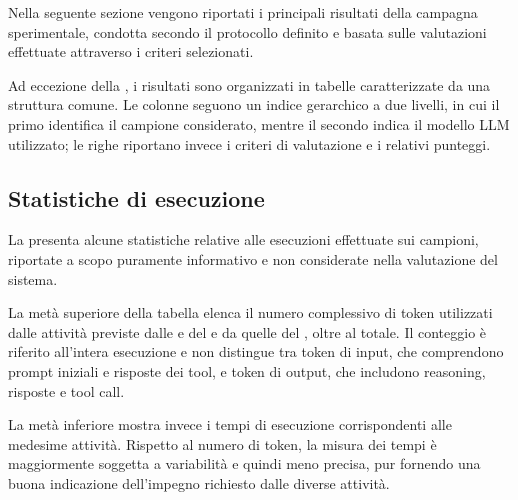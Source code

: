 Nella seguente sezione vengono riportati i principali risultati della campagna sperimentale, condotta secondo il protocollo definito e basata sulle valutazioni effettuate attraverso i criteri selezionati.

Ad eccezione della , i risultati sono organizzati in tabelle caratterizzate da una struttura comune. Le colonne seguono un indice gerarchico a due livelli, in cui il primo identifica il campione considerato, mentre il secondo indica il modello LLM utilizzato; le righe riportano invece i criteri di valutazione e i relativi punteggi.


\subsection{Statistiche di esecuzione} %

La  presenta alcune statistiche relative alle esecuzioni effettuate sui campioni, riportate a scopo puramente informativo e non considerate nella valutazione del sistema.

La metà superiore della tabella elenca il numero complessivo di token utilizzati dalle attività previste dalle \renaming{} e \reversing{} del \sreagent{} e da quelle del \codeagent{}, oltre al totale. Il conteggio è riferito all'intera esecuzione e non distingue tra token di input, che comprendono prompt iniziali e risposte dei tool, e token di output, che includono reasoning, risposte e tool call.


La metà inferiore mostra invece i tempi di esecuzione corrispondenti alle medesime attività. Rispetto al numero di token, la misura dei tempi è maggiormente soggetta a variabilità e quindi meno precisa, pur fornendo una buona indicazione dell'impegno richiesto dalle diverse attività.

\begin{table}[t]
    \centering
    \caption[Statistiche di esecuzione del sistema]{
        Statistiche relative ai token utilizzati e ai tempi di esecuzione delle macro-attività del sistema, con distinzione tra quelle previste dalla \renaming{} (\emph{Ren.}), dalla \reversing{} (\emph{Rev.}) e dal \codeagent{} (\emph{Code}).
    }
    \label{tab:execution_stats}
\end{table}


